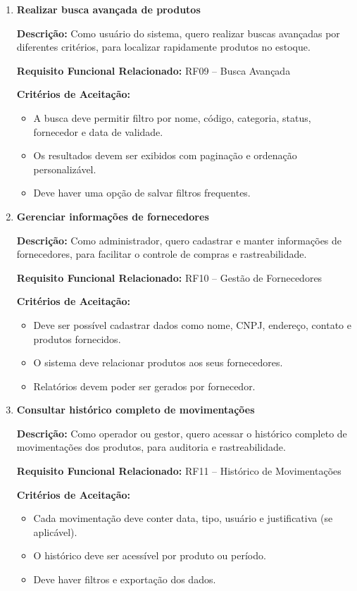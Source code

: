 \documentclass[
	12pt,				%
	openany,			%
	twoside,			%
	a4paper,			%
	english,			%
	brazil				%
	]{abntex2}
\begin{document}
\begin{enumerate}
\item \textbf{Realizar busca avançada de produtos}

\textbf{Descrição:} Como usuário do sistema, quero realizar buscas avançadas por diferentes critérios, para localizar rapidamente produtos no estoque.

\textbf{Requisito Funcional Relacionado:} RF09 -- Busca Avançada

\textbf{Critérios de Aceitação:}
\begin{itemize}
  \item A busca deve permitir filtro por nome, código, categoria, status, fornecedor e data de validade.
  \item Os resultados devem ser exibidos com paginação e ordenação personalizável.
  \item Deve haver uma opção de salvar filtros frequentes.
\end{itemize}

\item \textbf{Gerenciar informações de fornecedores}

\textbf{Descrição:} Como administrador, quero cadastrar e manter informações de fornecedores, para facilitar o controle de compras e rastreabilidade.

\textbf{Requisito Funcional Relacionado:} RF10 -- Gestão de Fornecedores

\textbf{Critérios de Aceitação:}
\begin{itemize}
  \item Deve ser possível cadastrar dados como nome, CNPJ, endereço, contato e produtos fornecidos.
  \item O sistema deve relacionar produtos aos seus fornecedores.
  \item Relatórios devem poder ser gerados por fornecedor.
\end{itemize}

\item \textbf{Consultar histórico completo de movimentações}

\textbf{Descrição:} Como operador ou gestor, quero acessar o histórico completo de movimentações dos produtos, para auditoria e rastreabilidade.

\textbf{Requisito Funcional Relacionado:} RF11 -- Histórico de Movimentações

\textbf{Critérios de Aceitação:}
\begin{itemize}
  \item Cada movimentação deve conter data, tipo, usuário e justificativa (se aplicável).
  \item O histórico deve ser acessível por produto ou período.
  \item Deve haver filtros e exportação dos dados.
\end{itemize}


\end{enumerate}
\end{document}

